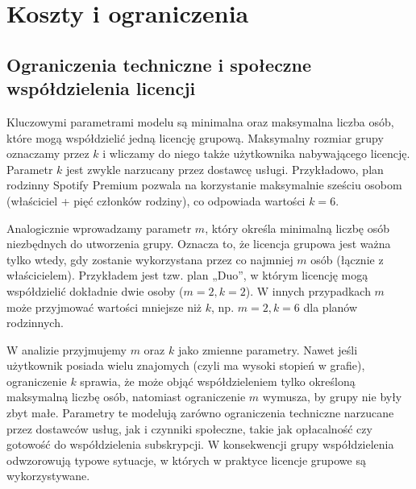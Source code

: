\section{Koszty i ograniczenia}

\subsection{Ograniczenia techniczne i społeczne współdzielenia licencji}

Kluczowymi parametrami modelu są minimalna oraz maksymalna liczba osób, które mogą współdzielić jedną licencję grupową. Maksymalny rozmiar grupy oznaczamy przez $k$ i wliczamy do niego także użytkownika nabywającego licencję. Parametr $k$ jest zwykle narzucany przez dostawcę usługi. Przykładowo, plan rodzinny Spotify Premium pozwala na korzystanie maksymalnie sześciu osobom (właściciel + pięć członków rodziny), co odpowiada wartości $k=6$.

Analogicznie wprowadzamy parametr $m$, który określa minimalną liczbę osób niezbędnych do utworzenia grupy. Oznacza to, że licencja grupowa jest ważna tylko wtedy, gdy zostanie wykorzystana przez co najmniej $m$ osób (łącznie z właścicielem). Przykładem jest tzw. plan „Duo”, w którym licencję mogą współdzielić dokładnie dwie osoby ($m=2, k=2$). W innych przypadkach $m$ może przyjmować wartości mniejsze niż $k$, np. $m=2, k=6$ dla planów rodzinnych.

W analizie przyjmujemy $m$ oraz $k$ jako zmienne parametry. Nawet jeśli użytkownik posiada wielu znajomych (czyli ma wysoki stopień w grafie), ograniczenie $k$ sprawia, że może objąć współdzieleniem tylko określoną maksymalną liczbę osób, natomiast ograniczenie $m$ wymusza, by grupy nie były zbyt małe. Parametry te modelują zarówno ograniczenia techniczne narzucane przez dostawców usług, jak i czynniki społeczne, takie jak opłacalność czy gotowość do współdzielenia subskrypcji. W konsekwencji grupy współdzielenia odwzorowują typowe sytuacje, w których w praktyce licencje grupowe są wykorzystywane.




